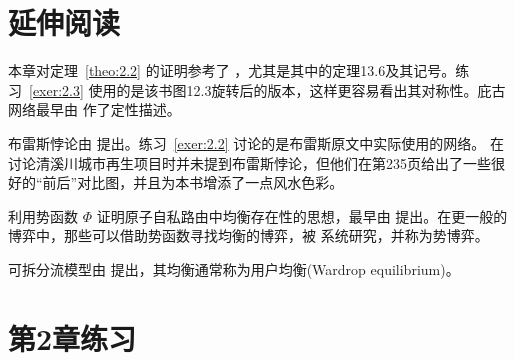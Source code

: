 \section{延伸阅读}\label{sec-2.7}

本章对定理~\ref{theo:2.2} 的证明参考了 \citet[Chapter~13]{roughgarden2016}，尤其是其中的定理13.6及其记号。练习~\ref{exer:2.3} 使用的是该书图12.3旋转后的版本，这样更容易看出其对称性。庇古网络最早由 \citet[p.~194]{pigou1920} 作了定性描述。

布雷斯悖论由 \citet{braess1968} 提出。练习~\ref{exer:2.2} 讨论的是布雷斯原文中实际使用的网络。\citet*{hong2007} 在讨论清溪川城市再生项目时并未提到布雷斯悖论，但他们在第235页给出了一些很好的“前后”对比图，并且为本书增添了一点风水色彩。

利用势函数 \(\Phi\) 证明原子自私路由中均衡存在性的思想，最早由 \citet{rosenthal1973} 提出。在更一般的博弈中，那些可以借助势函数寻找均衡的博弈，被 \citet{monderer1996} 系统研究，并称为势博弈。

可拆分流模型由 \citet{wardrop1952} 提出，其均衡通常称为用户均衡(Wardrop equilibrium)。

\section{第2章练习}

